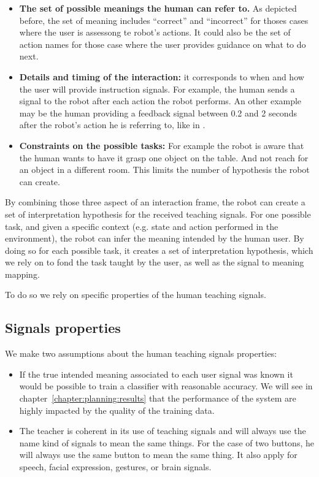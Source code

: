 \begin{itemize}

\item \textbf{The set of possible meanings the human can refer to.} As depicted before, the set of meaning includes ``correct'' and ``incorrect'' for thoses cases where the user is assessong te robot's actions. It could also be the set of action names for those case where the user provides guidance on what to do next.

\item \textbf{Details and timing of the interaction:} it corresponds to when and how the user will provide instruction signals. For example, the human sends a signal to the robot after each action the robot performs. An other example may be the human providing a feedback signal between 0.2 and 2 seconds after the robot's action he is referring to, like in \cite{knox2009interactively}.

\item \textbf{Constraints on the possible tasks:} For example the robot is aware that the human wants to have it grasp one object on the table. And not reach for an object in a different room. This limits the number of hypothesis the robot can create.

\end{itemize}

By combining those three aspect of an interaction frame, the robot can create a set of interpretation hypothesis for the received teaching signals. For one possible task, and given a specific context (e.g. state and action performed in the environment), the robot can infer the meaning intended by the human user. By doing so for each possible task, it creates a set of interpretation hypothesis, which we rely on to fond the task taught by the user, as well as the signal to meaning mapping.

To do so we rely on specific properties of the human teaching signals.

\subsection{Signals properties}
\label{chapter:lfui:signalproperties}

We make two assumptions about the human teaching signals properties:
\begin{itemize}

\item If the true intended meaning associated to each user signal was known it would be possible to train a classifier with reasonable accuracy. We will see in chapter~\ref{chapter:planning:results} that the performance of the system are highly impacted by the quality of the training data.

\item The teacher is coherent in its use of teaching signals and will always use the name kind of signals to mean the same things. For the case of two buttons, he will always use the same button to mean the same thing. It also apply for speech, facial expression, gestures, or brain signals. 

\end{itemize}

